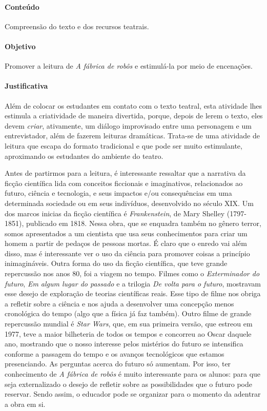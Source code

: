 \documentclass[11pt]{extarticle}
\begin{document}
\paragraph{Conteúdo} Compreensão do texto e dos recursos teatrais.

\paragraph{Objetivo} Promover a leitura de \textit{A fábrica de robôs} e estimulá-la por meio de encenações. 

\paragraph{Justificativa} Além de colocar os estudantes em contato com o texto teatral, esta atividade lhes estimula a criatividade de maneira divertida, porque, depois de lerem o texto, eles devem \textit{criar}, ativamente, um diálogo improvisado entre uma personagem e um entrevistador, além de fazerem leituras dramáticas. Trata-se de uma atividade de leitura que escapa do formato tradicional e que pode ser muito estimulante, aproximando os estudantes do ambiente do teatro.         

Antes de partirmos para a leitura, é interessante ressaltar que a narrativa da ficção científica lida com conceitos ficcionais e imaginativos, relacionados ao futuro, ciência e tecnologia, e seus impactos e/ou consequências em uma determinada sociedade ou em seus indivíduos, desenvolvido no século XIX. Um dos marcos inicias da ficção científica é \textit{Frankenstein}, de Mary Shelley (1797-1851), publicado em 1818. Nessa obra, que se enquadra também no gênero terror, somos apresentados a um cientista que usa seus conhecimentos para criar um homem a partir de pedaços de pessoas mortas. É claro que o enredo vai além disso, mas é interessante ver o uso da ciência para promover coisas a princípio inimagináveis. Outra forma do uso da ficção científica, que teve grande repercussão nos anos 80, foi a viagem no tempo. Filmes como o \textit{Exterminador do futuro}, \textit{Em algum lugar do passado} e a trilogia \textit{De volta para o futuro}, mostravam esse desejo de exploração de teorias científicas reais. Esse tipo de filme nos obriga a refletir sobre a ciência e nos ajuda a desenvolver uma concepção menos cronológica do tempo (algo que a física já faz também). Outro filme de grande repercussão mundial é \textit{Star Wars}, que, em sua primeira versão, que estreou em 1977, teve a maior bilheteria de todos os tempos e concorreu ao Oscar daquele ano, mostrando que o nosso interesse pelos mistérios do futuro se intensifica conforme a passagem do tempo e os avanços tecnológicos que estamos presenciando. As perguntas acerca do futuro só aumentam. Por isso, ter conhecimento de \textit{A fábrica de robôs} é muito interessante para os alunos: para que seja externalizado o desejo de refletir sobre as possibilidades que o futuro pode reservar. Sendo assim, o educador pode se organizar para o momento da adentrar a obra em si.
\end{document}
